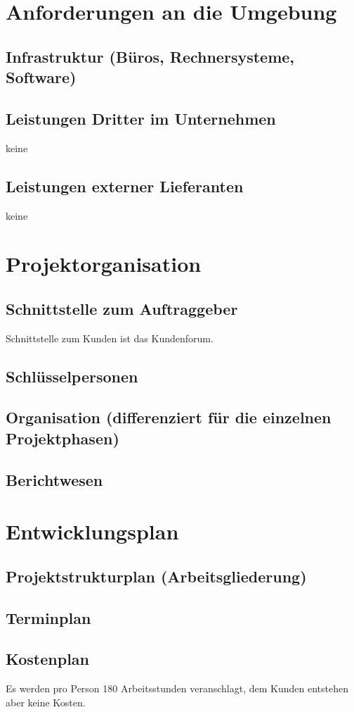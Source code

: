 \documentclass[a4paper,10pt]{scrartcl}
\begin{document}
\section{Anforderungen an die Umgebung}
\subsection{Infrastruktur (Büros, Rechnersysteme, Software)}
\subsection{Leistungen Dritter im Unternehmen}
keine
\subsection{Leistungen externer Lieferanten}
keine




\section{Projektorganisation}
\subsection{Schnittstelle zum Auftraggeber}
Schnittstelle zum Kunden ist das Kundenforum. 
\subsection{Schlüsselpersonen}
\subsection{Organisation (differenziert für die einzelnen Projektphasen)}
\subsection{Berichtwesen}


\section{Entwicklungsplan}
\subsection{Projektstrukturplan (Arbeitsgliederung)}
\subsection{Terminplan}
\subsection{Kostenplan}
Es werden pro Person 180 Arbeitsstunden veranschlagt, dem Kunden entstehen aber keine Kosten.
\end{document}
